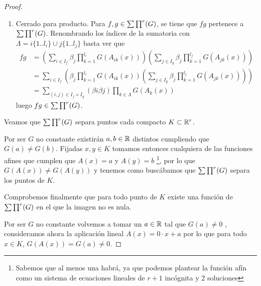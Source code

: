 \begin{proof}
\begin{enumerate}
        \item Cerrado para producto. Para $f,g \in \sum \prod^r (G)$, se tiene que $fg$ pertenece a $\sum \prod^r (G)$. 
        Renombrando los índices de la sumatoria con $\Lambda = i\{1..l_i\} \cup j\{1..l_j\}$ basta ver que 
        \begin{equation}
            \begin{split}
                fg &= \left(\sum_{i \in I_f} \beta_{j}  \prod_{k=1}^{l_{i}}  G(A_{ik}(x))\right)
                    \left(\sum_{j \in I_g}   \beta_{j}  \prod_{k=1}^{l_{j}} G(A_{jk}(x)) \right) \\
                    & = \sum_{i \in I_f} \left(  \beta_{j}  \prod_{k=1}^{l_{i}}  G(A_{ik}(x))
                        \left( \sum_{j \in I_g}  \beta_{j} \prod_{k=1}^{l_{j}} G(A_{jk}(x))  \right)  
                     \right) \\
                    & =  \sum_{(i,j) \in I_f \times I_g} (\beta{i}\beta{j}) \prod_{k \in \Lambda} G(A_{k}(x))
            \end{split}
        \end{equation}
        luego $fg \in \sum \prod^r (G)$. 
    \end{enumerate}

    Veamos que $\sum \prod^r (G)$ separa puntos cada compacto $K \subset \mathbb{R}^r$. 

    Por ser $G$ no constante existirán $a,b \in \mathbb{R}$ distintos cumpliendo que $G(a) \neq G(b)$. Fijadas $x,y \in K$ tomamos entonces cualquiera de las 
    funciones afines que cumplen que $A(x) = a$ y $A(y)=b$ 
    \footnote{Sabemos que al menos una habrá, ya que podemos plantear la función afín
    como un sistema de ecuaciones lineales de $r+1$ incógnita y 2 soluciones}, 
    por lo que $G(A(x)) \neq G(A(y))$ y tenemos como buscábamos que $\sum \prod^r (G)$ separa los puntos de $K$. 

    Comprobemos finalmente que para todo punto de $K$ existe una función de $\sum \prod^r (G)$  en el que la imagen no es nula.  

    Por ser $G$ no constante volvemos a tomar un $a \in \mathbb{R}$ tal que $G(a) \neq 0$ , consideramos ahora la aplicación lineal
    $A(x) = 0 \cdot x + a$ por lo que para todo $x \in K$, $G(A(x)) = G(a) \neq 0$. 


\end{proof}

